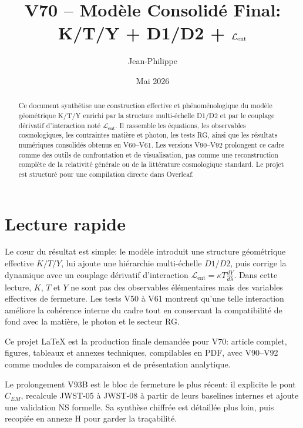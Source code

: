 \documentclass[11pt,a4paper]{article}
\title{V70 -- Modèle Consolidé Final: K/T/Y + D1/D2 + $\Lent$}
\author{Jean-Philippe}
\date{Mai 2026}
\newcommand{\kent}{\kappa} %
\newcommand{\Lent}{\mathcal{L}_{\mathrm{ent}}}
\begin{document}
\maketitle

\begin{abstract}
Ce document synthétise une construction effective et phénoménologique du modèle géométrique K/T/Y enrichi par la structure multi-échelle D1/D2 et par le couplage dérivatif d'interaction noté $\Lent$. Il rassemble les équations, les observables cosmologiques, les contraintes matière et photon, les tests RG, ainsi que les résultats numériques consolidés obtenus en V60--V61. Les versions V90--V92 prolongent ce cadre comme des outils de confrontation et de visualisation, pas comme une reconstruction complète de la relativité générale ou de la littérature cosmologique standard. Le projet est structuré pour une compilation directe dans Overleaf.
\end{abstract}

\tableofcontents
\newpage

\section{Lecture rapide}
Le cœur du résultat est simple: le modèle introduit une structure géométrique effective $K/T/Y$, lui ajoute une hiérarchie multi-échelle $D1/D2$, puis corrige la dynamique avec un couplage dérivatif d'interaction $\Lent=\kent T \frac{dY}{d\lambda}$. Dans cette lecture, $K$, $T$ et $Y$ ne sont pas des observables élémentaires mais des variables effectives de fermeture. Les tests V50 à V61 montrent qu'une telle interaction améliore la cohérence interne du cadre tout en conservant la compatibilité de fond avec la matière, le photon et le secteur RG.

Ce projet LaTeX est la production finale demandée pour V70: article complet, figures, tableaux et annexes techniques, compilables en PDF, avec V90--V92 comme modules de comparaison et de présentation analytique.

Le prolongement V93B est le bloc de fermeture le plus récent: il explicite le pont $C_{EM}$, recalcule JWST-05 à JWST-08 à partir de leurs baselines internes et ajoute une validation NS formelle. Sa synthèse chiffrée est détaillée plus loin, puis recopiée en annexe H pour garder la traçabilité.
\end{document}

